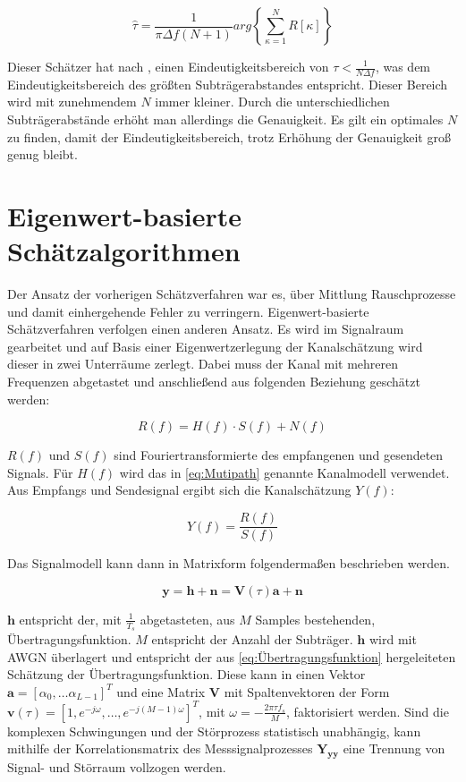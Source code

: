 \begin{equation}
	\label{L&R}
	\hat{\tau} = \frac{1}{\pi \Delta f (N+1)}arg\left\lbrace \sum_{\kappa = 1}^{N} R[\kappa]\right\rbrace
\end{equation}

Dieser Schätzer hat nach \cite[S.90]{mengali1997synchronization}, einen Eindeutigkeitsbereich von $\tau < \frac{1}{N\Delta f}$, was dem Eindeutigkeitsbereich des größten Subträgerabstandes entspricht. Dieser Bereich wird mit zunehmendem $N$ immer kleiner. Durch die unterschiedlichen Subträgerabstände erhöht man allerdings die Genauigkeit.
Es gilt ein optimales $N$ zu finden, damit der Eindeutigkeitsbereich, trotz Erhöhung der Genauigkeit groß genug bleibt. 


\section{Eigenwert-basierte Schätzalgorithmen}
\label{chap3.3:Subraum}
Der Ansatz der vorherigen Schätzverfahren war es, über Mittlung Rauschprozesse und damit einhergehende Fehler zu verringern. Eigenwert-basierte Schätzverfahren verfolgen einen anderen Ansatz. Es wird im Signalraum gearbeitet und auf Basis einer Eigenwertzerlegung der Kanalschätzung wird dieser in zwei Unterräume zerlegt. Dabei muss der Kanal mit mehreren Frequenzen abgetastet und anschließend aus folgenden Beziehung geschätzt werden:
 
\begin{equation}
	\label{eq:Kanalübertragung}
	R(f) = H(f) \cdot S(f) + N(f)
\end{equation}   

$R(f)$ und  $S(f)$ sind Fouriertransformierte des empfangenen und gesendeten Signals. Für $H(f)$ wird das in \eqref{eq:Mutipath} genannte Kanalmodell verwendet.
Aus Empfangs und Sendesignal ergibt sich die Kanalschätzung $Y(f)$:

\begin{equation}
	\label{eq:Übertragungsfunktion}
	Y(f) =\frac{R(f)}{S(f)}
\end{equation} 

 
Das Signalmodell kann dann in Matrixform folgendermaßen beschrieben werden. \cite{Super-resolution}

\begin{equation}
	\label{eq:Signalmodell in Matrixfrom}
	\mathbf{y  = h + n = V}(\tau) \mathbf{a + n}
\end{equation}

$\mathbf{h}$ entspricht der, mit $\frac{1}{T_s}$ abgetasteten, aus $M$ Samples bestehenden, Übertragungsfunktion. $M$ entspricht der Anzahl der Subträger. $\mathbf{h}$ wird mit \gls{AWGN} überlagert und entspricht der aus \eqref{eq:Übertragungsfunktion} hergeleiteten Schätzung der Übertragungsfunktion. Diese kann in einen Vektor $\mathbf{a} = [\alpha_0, \ldots \alpha_{L-1}]^T$ und eine Matrix $\mathbf{V}$ mit Spaltenvektoren der Form $\mathbf{v}(\tau) = [1, e^{-j\omega}, \ldots, e^{-j(M-1)\omega}]^T$, mit $\omega = -\frac{2\pi \tau f_s}{M}$, faktorisiert werden.
Sind die komplexen Schwingungen und der Störprozess statistisch unabhängig, kann mithilfe der Korrelationsmatrix des Messsignalprozesses $\mathbf{Y_{yy}}$ eine Trennung von Signal- und Störraum vollzogen werden.  

